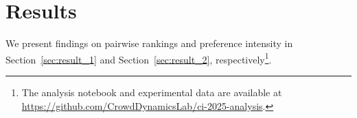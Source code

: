 \section{Results}
We present findings on pairwise rankings and preference intensity in Section~\ref{sec:result_1} and Section~\ref{sec:result_2}, respectively\footnote{The analysis notebook and experimental data are available at \url{https://github.com/CrowdDynamicsLab/ci-2025-analysis}.}.


